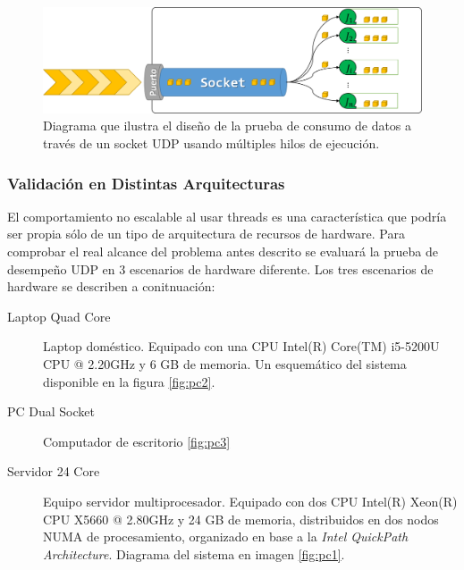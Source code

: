 \begin{figure}[!h]
	\centering
	\includegraphics[scale=0.5]{imagenes/casoDeEstudio.png}
	\caption{Diagrama que ilustra el diseño de la prueba de consumo de datos a través de un socket UDP usando múltiples hilos de ejecución.}
	\label{fig:testUDP}
\end{figure}

\subsubsection{Validación en Distintas Arquitecturas}

El comportamiento no escalable al usar threads es una característica que podría ser propia sólo de un tipo de arquitectura de recursos de hardware. Para comprobar el real alcance del problema antes descrito se evaluará la prueba de desempeño UDP en 3 escenarios de hardware diferente. Los tres escenarios de hardware se describen a conitnuación:

\begin{description}
\item[Laptop Quad Core] Laptop doméstico. Equipado con una CPU Intel(R) Core(TM) i5-5200U CPU @ 2.20GHz y 6 GB de memoria. Un esquemático del sistema disponible en la figura \ref{fig:pc2}.
\item[PC Dual Socket] Computador de escritorio \ref{fig:pc3}
\item[Servidor 24 Core] Equipo servidor multiprocesador. Equipado con dos CPU Intel(R) Xeon(R) CPU X5660 @ 2.80GHz y 24 GB de memoria, distribuidos en dos nodos NUMA de procesamiento, organizado en base a la \emph{Intel QuickPath Architecture}. Diagrama del sistema en imagen \ref{fig:pc1}.
\end{description}

